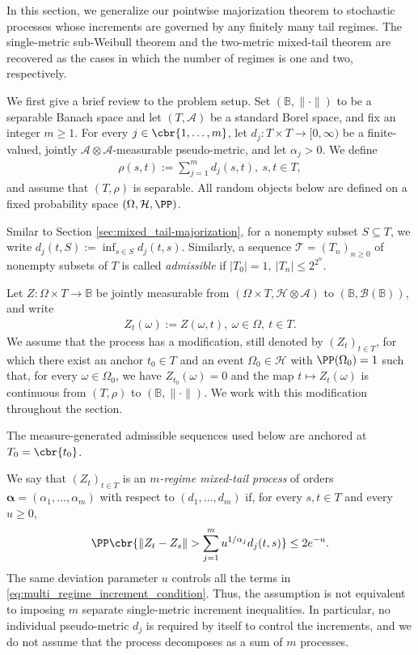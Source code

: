 \documentclass[11pt]{article}
\begin{document}
In this section, we generalize our pointwise majorization theorem to
stochastic processes whose increments are governed by any finitely many tail
regimes. The single-metric sub-Weibull theorem and the two-metric
mixed-tail theorem are recovered as the cases in which the number of
regimes is one and two, respectively.

We first give a brief review to the problem setup. Set $(\mathbb B,\|\cdot\|)$ to be a separable Banach space and let
$(T,\mathcal A)$ be a standard Borel space, and fix an integer $m\ge1$.
For every $j\in\cbr{1,\ldots,m}$, let
$d_j:T\times T\longrightarrow[0,\infty)$ be a finite-valued, jointly
$\mathcal A\otimes\mathcal A$-measurable pseudo-metric, and let
$\alpha_j>0$. We define
\begin{align*}
\rho(s,t)
:=
\sum_{j=1}^m d_j(s,t),
\ s,t\in T,
\end{align*}
and assume that $(T,\rho)$ is separable. All random objects below are
defined on a fixed probability space $(\Omega,\mathcal H,\PP)$.

Smilar to Section \ref{sec:mixed_tail-majorization}, for a nonempty subset $S\subseteq T$, we write $d_j(t,S)
:=
\inf_{s\in S}d_j(t,s)$.
Similarly, a sequence $\mathcal T=(T_n)_{n\ge0}$ of nonempty subsets of $T$ is called
\emph{admissible} if $|T_0|=1,\ |T_n|\le2^{2^n}$.

Let $Z:\Omega\times T\longrightarrow\mathbb B$ be jointly measurable
from $(\Omega\times T,\mathcal H\otimes\mathcal A)$ to
$(\mathbb B,\mathcal B(\mathbb B))$, and write
\begin{align*}
Z_t(\omega):=Z(\omega,t),
\ \omega\in\Omega,\ t\in T.
\end{align*}
We assume that the process has a modification, still denoted by
$(Z_t)_{t\in T}$, for which
there exist an anchor $t_0\in T$ and an event
$\Omega_0\in\mathcal H$ with $\PP(\Omega_0)=1$ such that, for every
$\omega\in\Omega_0$, we have $Z_{t_0}(\omega)=0$
and the map $t\mapsto Z_t(\omega)$ is continuous from $(T,\rho)$ to
$(\mathbb B,\|\cdot\|)$. We work with this modification throughout the section.

The measure-generated admissible sequences used below are anchored at
$T_0=\cbr{t_0}$.

We say that $(Z_t)_{t\in T}$ is an \emph{$m$-regime mixed-tail process}
of orders $\boldsymbol\alpha=(\alpha_1,\ldots,\alpha_m)$ with respect to
$(d_1,\ldots,d_m)$ if, for every $s,t\in T$ and every $u\ge0$,
\begin{align}
\PP\cbr{
\|Z_t-Z_s\|
>
\sum_{j=1}^m u^{1/\alpha_j}d_j(t,s)
}
\le2e^{-u}.
\label{eq:multi_regime_increment_condition}
\end{align}
The same deviation parameter $u$ controls all the terms in
\eqref{eq:multi_regime_increment_condition}. Thus, the assumption is not
equivalent to imposing $m$ separate single-metric increment inequalities.
In particular, no individual pseudo-metric $d_j$ is required by itself to
control the increments, and we do not assume that the process decomposes
as a sum of $m$ processes.
\end{document}
